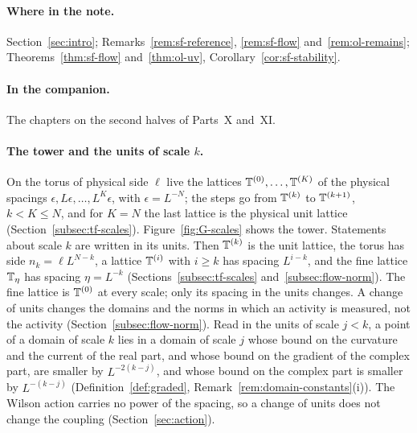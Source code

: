 \paragraph{Where in the note.} Section~\ref{sec:intro}; Remarks~\ref{rem:sf-reference}, \ref{rem:sf-flow} and~\ref{rem:ol-remains}; Theorems~\ref{thm:sf-flow} and~\ref{thm:ol-uv}, Corollary~\ref{cor:sf-stability}.

\paragraph{In the companion.} The chapters on the second halves of Parts~X and~XI.

\label{g:scales}



\paragraph{The tower and the units of scale $k$.} On the torus of physical side $\ell$ live the lattices $\mathbb T^{(0)},\dots,\mathbb T^{(K)}$ of the physical spacings $\epsilon,L\epsilon,\dots,L^K\epsilon$, with $\epsilon=L^{-N}$; the steps go from $\mathbb T^{(k)}$ to $\mathbb T^{(k+1)}$, $k<K\le N$, and for $K=N$ the last lattice is the physical unit lattice (Section~\ref{subsec:tf-scales}). Figure~\ref{fig:G-scales} shows the tower. Statements about scale $k$ are written in its units. Then $\mathbb T^{(k)}$ is the unit lattice, the torus has side $n_k=\ell L^{N-k}$, a lattice $\mathbb T^{(i)}$ with $i\ge k$ has spacing $L^{i-k}$, and the fine lattice $\mathbb T_\eta$ has spacing $\eta=L^{-k}$ (Sections~\ref{subsec:tf-scales} and~\ref{subsec:flow-norm}). The fine lattice is $\mathbb T^{(0)}$ at every scale; only its spacing in the units changes. A change of units changes the domains and the norms in which an activity is measured, not the activity (Section~\ref{subsec:flow-norm}). Read in the units of scale $j<k$, a point of a domain of scale $k$ lies in a domain of scale $j$ whose bound on the curvature and the current of the real part, and whose bound on the gradient of the complex part, are smaller by $L^{-2(k-j)}$, and whose bound on the complex part is smaller by $L^{-(k-j)}$ (Definition~\ref{def:graded}, Remark~\ref{rem:domain-constants}(i)). The Wilson action carries no power of the spacing, so a change of units does not change the coupling (Section~\ref{sec:action}).

